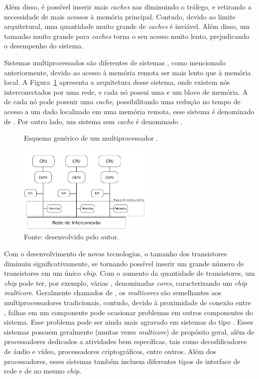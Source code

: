 Além disso, é possível inserir mais \textit{caches} nas \cpus
diminuindo o tráfego, e retirando a necessidade de mais acessos à memória
principal. Contudo, devido ao limite arquitetural, uma quantidade muito grande
de \textit{caches} é inviável. Além disso, um tamanho muito grande para
\textit{caches} torna o seu acesso muito lento, prejudicando o desempenho do
sistema.

Sistemas multiprocessados \numa são diferentes de sistemas \uma, como mencionado
anteriormente, devido ao acesso à memória remota ser mais lento que à memória
local. A Figura~\ref{fig:numa} apresenta a arquitetura desse sistema, onde
existem nós interconectados por uma rede, e cada nó possui uma \cpu e um bloco
de memória. A \cpu de cada nó pode possuir uma \textit{cache}, possibilitando
uma redução no tempo de acesso a um dado localizado em uma memória remota, esse
sistema é denominado de \ccnuma. Por outro lado, um sistema sem \textit{cache} é
denominado \ncnuma.

\begin{figure}[t]
	\centering
    \caption{Esquema genérico de um multiprocessador \numa.}
    \includegraphics[width=0.6\textwidth]{figs/multiprocNUMA.pdf}
    \caption*{Fonte: desenvolvido pelo autor.}
    \label{fig:numa}
\end{figure}

Com o desenvolvimento de novas tecnologias, o tamanho
dos transistores diminuiu significativamente, se tornando possível inserir um
grande número de transistores em um único \textit{chip}.
Com o aumento da quantidade de transistores, um \textit{chip} pode ter, por
exemplo, várias \cpus, denominadas \textit{cores}, caracterizando um
\textit{chip} \textit{multicore}.
Geralmente chamados de \cmps, os \textit{multicores} são semelhantes aos multiprocessadores
tradicionais, contudo, devido à proximidade de conexão entre \cpus, falhas em um
componente pode ocasionar problemas em outros componentes do sistema.
Esse problema pode ser ainda mais agravado em sistemas do tipo \mpsoc. Esses sistemas
possuem geralmente \cpus (muitas vezes \textit{multicore}) de propósito geral, além de processadores
dedicados a atividades bem específicas, tais como decodificadores de áudio e vídeo, processadores
criptográficos, entre outros. Além dos processadores, esses sistemas também incluem diferentes tipos
de interface de rede e de \es no mesmo \textit{chip}.


